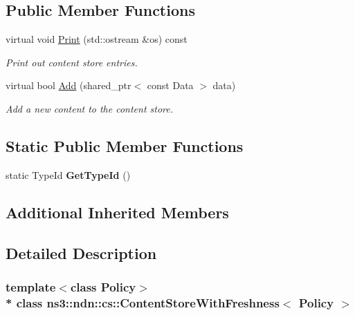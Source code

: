 \subsection*{Public Member Functions}
\begin{DoxyCompactItemize}
\item 
virtual void \hyperlink{classns3_1_1ndn_1_1cs_1_1ContentStoreWithFreshness_a93b66c531203bfd201ec24aba47b6964}{Print} (std\+::ostream \&os) const\hypertarget{classns3_1_1ndn_1_1cs_1_1ContentStoreWithFreshness_a93b66c531203bfd201ec24aba47b6964}{}\label{classns3_1_1ndn_1_1cs_1_1ContentStoreWithFreshness_a93b66c531203bfd201ec24aba47b6964}

\begin{DoxyCompactList}\small\item\em Print out content store entries. \end{DoxyCompactList}\item 
virtual bool \hyperlink{classns3_1_1ndn_1_1cs_1_1ContentStoreWithFreshness_a9251bd764c52de8201da5de8259983df}{Add} (shared\+\_\+ptr$<$ const Data $>$ data)
\begin{DoxyCompactList}\small\item\em Add a new content to the content store. \end{DoxyCompactList}\end{DoxyCompactItemize}
\subsection*{Static Public Member Functions}
\begin{DoxyCompactItemize}
\item 
static Type\+Id {\bfseries Get\+Type\+Id} ()\hypertarget{classns3_1_1ndn_1_1cs_1_1ContentStoreWithFreshness_a32b9b090ab6911360387fe59a6a0c021}{}\label{classns3_1_1ndn_1_1cs_1_1ContentStoreWithFreshness_a32b9b090ab6911360387fe59a6a0c021}

\end{DoxyCompactItemize}
\subsection*{Additional Inherited Members}


\subsection{Detailed Description}
\subsubsection*{template$<$class Policy$>$\\*
class ns3\+::ndn\+::cs\+::\+Content\+Store\+With\+Freshness$<$ Policy $>$}


